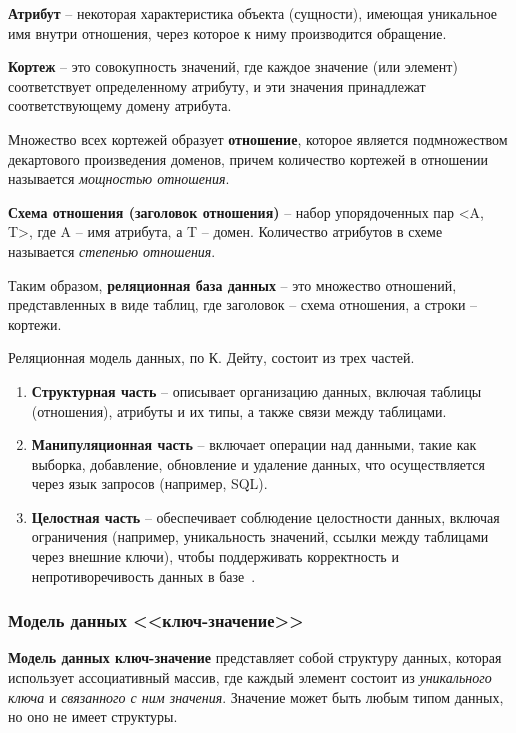 \textbf{Атрибут} -- некоторая характеристика объекта (сущности), имеющая уникальное имя внутри отношения, через которое к ниму производится обращение.

\textbf{Кортеж} -- это совокупность значений, где каждое значение (или элемент) соответствует определенному атрибуту, и эти значения принадлежат соответствующему домену атрибута.

Множество всех кортежей образует \textbf{отношение}, которое является подмножеством декартового произведения доменов, причем количество кортежей в отношении называется \textit{мощностью отношения}.

\textbf{Схема отношения (заголовок отношения)} -- набор упорядоченных пар <A, T>, где A -- имя атрибута, а T -- домен. Количество атрибутов в схеме называется \textit{степенью отношения}.

Таким образом,  \textbf{реляционная база данных} -- это множество отношений, представленных в виде таблиц, где заголовок -- схема отношения, а строки -- кортежи.

Реляционная модель данных, по К. Дейту, состоит из трех частей.
 \begin{enumerate}[label=\arabic*.]
 		\item  \textbf{Структурная часть} -- описывает организацию данных, включая таблицы (отношения), атрибуты и их типы, а также связи между таблицами.
 		\item \textbf{Манипуляционная часть} -- включает операции над данными, такие как выборка, добавление, обновление и удаление данных, что осуществляется через язык запросов (например, SQL).
 		\item \textbf{Целостная часть} -- обеспечивает соблюдение целостности данных, включая ограничения (например, уникальность значений, ссылки между таблицами через внешние ключи), чтобы поддерживать корректность и непротиворечивость данных в базе~\cite[С. 30-35]{Avrunyev2018}.
 \end{enumerate}
 
 \subsubsection{Модель данных <<ключ-значение>>}
 
 \textbf{Модель данных ключ-значение} представляет собой структуру данных, которая использует ассоциативный массив, где каждый элемент состоит из \textit{уникального ключа} и \textit{связанного с ним значения}. Значение может быть любым типом данных, но оно не имеет структуры.
 
